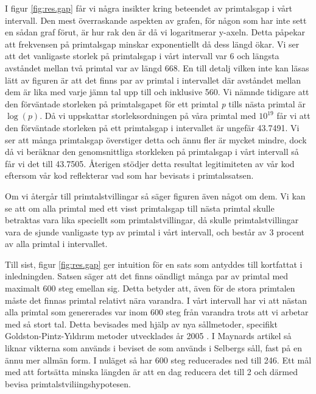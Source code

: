 I figur \ref{fig:res.gap} får vi några insikter kring beteendet av primtalsgap i vårt intervall. 
Den mest överraskande aspekten av grafen, för någon som har inte sett en sådan graf förut, är hur rak den är då vi logaritmerar y-axeln.
Detta påpekar att frekvensen på primtalsgap minskar exponentiellt då dess längd ökar. 
Vi ser att det vanligaste storlek på primtalsgap i vårt intervall var 6 och längsta avståndet mellan två primtal var av längd 668.
En till detalj vilken inte kan läsas lätt av figuren är att det finns par av primtal i intervallet där avståndet mellan dem är lika med varje jämn tal upp till och inklusive 560.
Vi nämnde tidigare att den förväntade storleken på primtalsgapet för ett primtal \textit{p} tills nästa primtal är \(\log(p)\). 
Då vi uppskattar storleksordningen på våra primtal med \(10^{19}\) får vi att den förväntade storleken på ett primtalsgap i intervallet är ungefär 43.7491.
Vi ser att många primtalsgap överstiger detta och ännu fler är mycket mindre, dock då vi beräknar den genomsnittliga storkleken på primtalsgap i vårt intervall så får vi det till 43.7505.
Återigen stödjer detta resultat legitimiteten av vår kod eftersom vår kod reflekterar vad som har bevisats i primtalssatsen.

Om vi återgår till primtalstvillingar så säger figuren även något om dem. 
Vi kan se att om alla primtal med ett visst primtalsgap till nästa primtal skulle betraktas vara lika speciellt som primtalstvillingar, då skulle primtalstvillingar vara de sjunde vanligaste typ av primtal i vårt intervall, och består av 3 procent av alla primtal i intervallet.

Till sist, figur \ref{fig:res.gap} ger intuition för en sats som antyddes till kortfattat i inledningden. 
Satsen säger att det finns oändligt många par av primtal med maximalt 600 steg emellan sig. 
Detta betyder att, även för de stora primtalen måste det finnas primtal relativt nära varandra.
I vårt intervall har vi att nästan alla primtal som genererades var inom 600 steg från varandra trots att vi arbetar med så stort tal.
Detta bevisades med hjälp av nya sållmetoder, specifikt Goldston-Pintz-Yıldırım metoder utvecklades år 2005 \cite{GPY}.
I Maynards artikel så liknar vikterna som används i beviset de som används i Selbergs såll, fast på en ännu mer allmän form. 
I nuläget så har 600 steg reducerades ned till 246. 
Ett mål med att fortsätta minska längden är att en dag reducera det till 2 och därmed bevisa primtalstviliingshypotesen.

